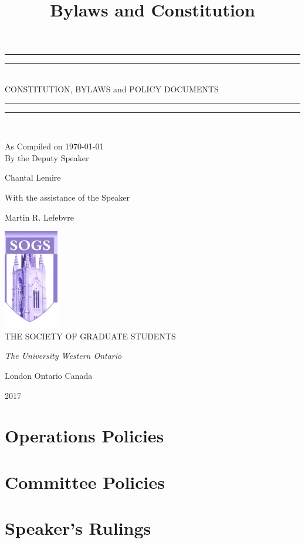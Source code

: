 \documentclass[12pt,letterpaper]{book}
\title{Bylaws and Constitution}
\newcommand*{\titleGP}{\begingroup %
\centering %
\vspace*{\baselineskip} %

\rule{\textwidth}{1.6pt}\vspace*{-\baselineskip}\vspace*{2pt} %
\rule{\textwidth}{0.4pt}\\[\baselineskip] %

{\LARGE CONSTITUTION, BYLAWS} 
and
{\LARGE POLICY DOCUMENTS}

\rule{\textwidth}{0.4pt}\vspace*{-\baselineskip}\vspace{3.2pt} %
\rule{\textwidth}{1.6pt}\\[\baselineskip] %



\vspace*{2\baselineskip} %

As Compiled on \today \\[\baselineskip]
By the Deputy Speaker

{\Large Chantal Lemire \par} %
\vspace*{\baselineskip} %
With the assistance of the Speaker \\[\baselineskip]
{\large Martin R. Lefebvre \par}


\vfill %

\includegraphics{logo.jpg}\\[1cm]


{\large THE SOCIETY OF GRADUATE STUDENTS}\par %
\scshape %
{\itshape The University Western Ontario\par} %
London Ontario Canada\par %
{\scshape 2017} \\[0.3\baselineskip] %
\endgroup}
\begin{document}
 

\pagestyle{empty} %

\titleGP %

\tableofcontents %
\pagebreak %
\pagestyle{plain}






%

%



\chapter{Operations Policies}

 
 
 
 

 \chapter{Committee Policies}
 
 

\chapter{Speaker's Rulings}



\newpage
 
%
\printindex
\end{document}
